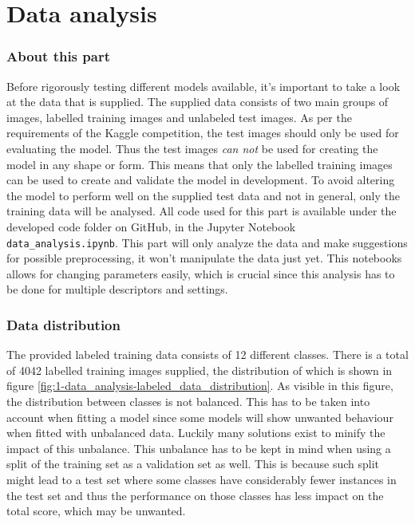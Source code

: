 \part{Data analysis}
\label{part:data_analysis}


\section{About this part}
\label{section:DA_about_part}
Before rigorously testing different models available, it's important to take a look at the data that is supplied.
The supplied data consists of two main groups of images, labelled training images and unlabeled test images.
As per the requirements of the Kaggle competition, the test images should only be used for evaluating the model.
Thus the test images \textit{can not} be used for creating the model in any shape or form.
This means that only the labelled training images can be used to create and validate the model in development.
To avoid altering the model to perform well on the supplied test data and not in general, only the training data will be analysed.
All code used for this part is available under the developed code folder on GitHub, in the Jupyter Notebook \texttt{data\_analysis.ipynb}.
This part will only analyze the data and make suggestions for possible preprocessing, it won't manipulate the data just yet.
This notebooks allows for changing parameters easily, which is crucial since this analysis has to be done for multiple descriptors and settings.


\section{Data distribution}
\label{section:DA_data_distribution}
The provided labeled training data consists of 12 different classes.
There is a total of 4042 labelled training images supplied, the distribution of which is shown in figure \ref{fig:1-data_analysis-labeled_data_distribution}.
As visible in this figure, the distribution between classes is not balanced.
This has to be taken into account when fitting a model since some models will show unwanted behaviour when fitted with unbalanced data.
Luckily many solutions exist to minify the impact of this unbalance.
This unbalance has to be kept in mind when using a split of the training set as a validation set as well.
This is because such split might lead to a test set where some classes have considerably fewer instances in the test set and thus the performance on those classes has less impact on the total score, which may be unwanted.


